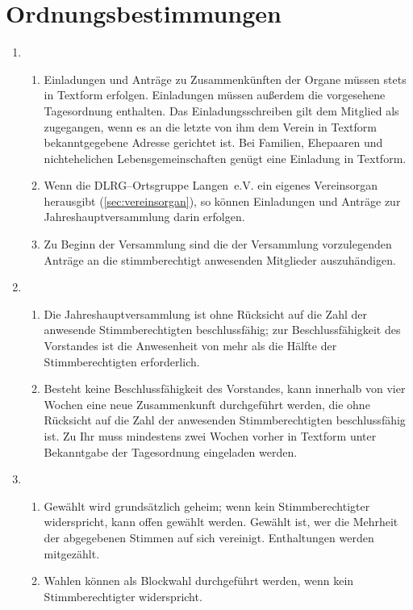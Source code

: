 \documentclass[%
12pt, %
a4paper, %
headsepline, %
footsepline, %
parskip, %
headings=normal, %
]{scrartcl}
\begin{document}
\section{Ordnungsbestimmungen}
\label{sec:ordnungsbestimmungen}
\begin{enumerate}
    \item \begin{enumerate}[noitemsep]
        \item Einladungen und Anträge zu Zusammenkünften der Organe müssen stets in Textform erfolgen. Einladungen müssen außerdem die vorgesehene Tagesordnung enthalten. Das Einladungsschreiben gilt dem Mitglied als zugegangen, wenn es an die letzte von ihm dem Verein in Textform bekanntgegebene Adresse gerichtet ist. Bei Familien, Ehepaaren und nichtehelichen Lebensgemeinschaften genügt eine Einladung in Textform.
        \item Wenn die DLRG--Ortsgruppe Langen~e.V. ein eigenes Vereinsorgan herausgibt (\ref{sec:vereinsorgan}), so können Einladungen und Anträge zur Jahreshauptversammlung darin erfolgen.
        \item Zu Beginn der Versammlung sind die der Versammlung vorzulegenden Anträge an die stimmberechtigt anwesenden Mitglieder auszuhändigen.
      \end{enumerate}
    \item \begin{enumerate}[noitemsep]
        \item Die Jahreshauptversammlung ist ohne Rücksicht auf die Zahl der anwesende Stimmberechtigten beschlussfähig; zur Beschlussfähigkeit des Vorstandes ist die Anwesenheit von mehr als die Hälfte der Stimmberechtigten erforderlich. 
        \item Besteht keine Beschlussfähigkeit des Vorstandes, kann innerhalb von vier Wochen eine neue Zusammenkunft durchgeführt werden, die ohne Rücksicht auf die Zahl der anwesenden Stimmberechtigten beschlussfähig ist. Zu Ihr muss mindestens zwei Wochen vorher in Textform unter Bekanntgabe der Tagesordnung eingeladen werden.
      \end{enumerate}
    \item \begin{enumerate}[noitemsep]
        \item Gewählt wird grundsätzlich geheim; wenn kein Stimmberechtigter widerspricht, kann offen gewählt werden. Gewählt ist, wer die Mehrheit der abgegebenen Stimmen auf sich vereinigt. Enthaltungen werden mitgezählt.
        \item Wahlen können als Blockwahl durchgeführt werden, wenn kein Stimmberechtigter widerspricht.

\end{enumerate}
\end{enumerate}
\end{document}
